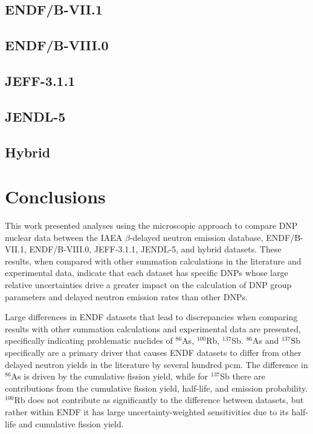 \documentclass[hidelinks]{style/nseJournal}
\begin{document}


\subsection{ENDF/B-VII.1}
\label{sec:b71}



\subsection{ENDF/B-VIII.0}
\label{sec:b80}



\subsection{JEFF-3.1.1}
\label{sec:jeff311}



\subsection{JENDL-5}
\label{sec:jendl5}




\subsection{Hybrid}




\section{Conclusions}

This work presented analyses using the microscopic approach to compare \gls{DNP} nuclear data between the IAEA $\beta$-delayed neutron emission database, ENDF/B-VII.1, ENDF/B-VIII.0, JEFF-3.1.1, JENDL-5, and hybrid datasets.
These results, when compared with other summation calculations in the literature and experimental data, indicate that each dataset has specific \glspl{DNP} whose large relative uncertainties drive a greater impact on the calculation of \gls{DNP} group parameters and delayed neutron emission rates than other \glspl{DNP}.

Large differences in ENDF datasets that lead to discrepancies when comparing results with other summation calculations and experimental data are presented, specifically indicating problematic nuclides of $^{86}$As, $^{100}$Rb, $^{137}$Sb.
$^{86}$As and $^{137}$Sb specifically are a primary driver that causes \gls{ENDF} datasets to differ from other delayed neutron yields in the literature by several hundred pcm.
The difference in $^{86}$As is driven by the cumulative fission yield, while for $^{137}$Sb there are contributions from the cumulative fission yield, half-life, and emission probability.
$^{100}$Rb does not contribute as significantly to the difference between datasets, but rather within \gls{ENDF} it has large uncertainty-weighted sensitivities due to its half-life and cumulative fission yield.
\end{document}
